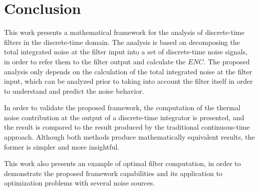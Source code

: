 \section{Conclusion}
This work presents a mathematical framework for the analysis of discrete-time filters in the discrete-time domain. The analysis is based on decomposing the total integrated noise at the filter input into a set of discrete-time noise signals, in order to refer them to the filter output and calculate the $\mathit{ENC}$. The proposed analysis only depends on the calculation of the total integrated noise at the filter input, which can be analyzed prior to taking into account the filter itself in order to understand and predict the noise behavior.

In order to validate the proposed framework, the computation of the thermal noise contribution at the output of a \mbox{discrete-time} integrator is presented, and the result is compared to the result produced by the traditional \mbox{continuous-time} approach. Although both methods produce mathematically equivalent results, the former is simpler and more insightful.

This work also presents an example of optimal filter computation, in order to demonstrate the proposed framework capabilities and its application to optimization problems with several noise sources.
